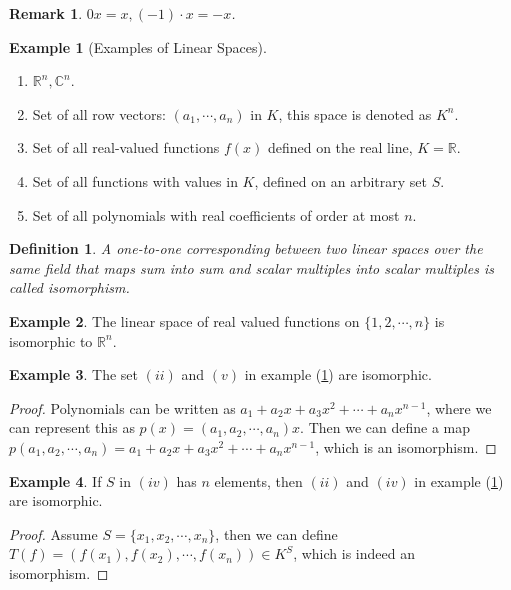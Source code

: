\documentclass[11pt]{book}
\newtheorem{definition}{Definition}[section]
\newtheorem{remark}{Remark}[section]
\theoremstyle{definition}
\newtheorem{example}{Example}[section]
\numberwithin{equation}{subsection}
\begin{document}
\begin{remark}
$0x = x, (-1)\cdot x = -x$.
\end{remark}

\medskip

\begin{example}[Examples of Linear Spaces]\label{example_1}
~\begin{enumerate}[label=(\roman*)]
    \item $\mathbb{R}^n, \mathbb{C}^n$.
    \item Set of all row vectors: $(a_1,\cdots, a_n)$ in $K$, this space is denoted as $K^n$.
    \item Set of all real-valued functions $f(x)$ defined on the real line, $K=\mathbb{R}$.
    \item Set of all functions with values in $K$, defined on an arbitrary set $S$.
    \item Set of all polynomials with real coefficients of order at most $n$.
\end{enumerate}
\end{example}

\medskip

\begin{definition}
A one-to-one corresponding between two linear spaces over the same field that maps sum into sum and scalar multiples into scalar multiples is called isomorphism.
\end{definition}

\begin{example}
The linear space of real valued functions on $\{1,2,\cdots,n\}$ is isomorphic to $\mathbb{R}^n$.
\end{example}

\medskip

\begin{example}
The set $(ii)$ and $(v)$ in example (\ref{example_1}) are isomorphic.
\end{example}
\begin{proof}
Polynomials can be written as $a_1+a_2x+a_3x^2+\cdots+a_nx^{n-1}$, where we can represent this as $p(x) = (a_1,a_2,\cdots,a_n)x$. Then we can define a map $p(a_1,a_2,\cdots,a_n) = a_1+a_2x+a_3x^2+\cdots+a_nx^{n-1}$, which is an isomorphism.
\end{proof}

\medskip

\begin{example}
If $S$ in $(iv)$ has $n$ elements, then $(ii)$ and $(iv)$ in example (\ref{example_1}) are isomorphic.
\end{example}
\begin{proof}
Assume $S = \{x_1, x_2,\cdots, x_n\}$, then we can define $T(f) = (f(x_1), f(x_2), \cdots, f(x_n))\in K^S$, which is indeed an isomorphism.
\end{proof}
\end{document}
